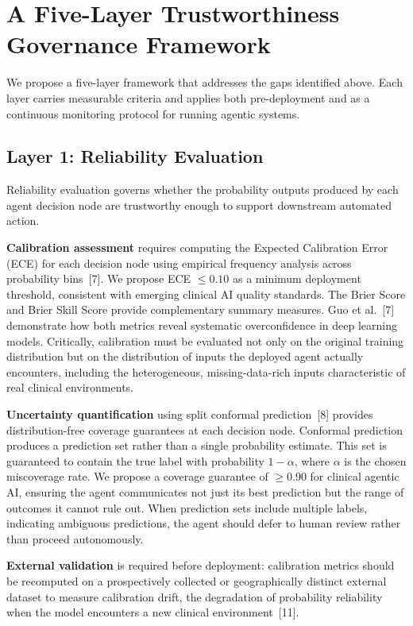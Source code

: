 \documentclass[11pt]{article}
\begin{document}
\section{A Five-Layer Trustworthiness Governance
Framework}\label{a-five-layer-trustworthiness-governance-framework}

We propose a five-layer framework that addresses the gaps identified
above. Each layer carries measurable criteria and applies both
pre-deployment and as a continuous monitoring protocol for running
agentic systems.

\subsection{Layer 1: Reliability Evaluation}\label{layer-1-reliability-evaluation}

Reliability evaluation governs whether the probability outputs produced
by each agent decision node are trustworthy enough to support downstream
automated action.

\textbf{Calibration assessment} requires computing the Expected
Calibration Error (ECE) for each decision node using empirical frequency
analysis across probability bins~{[}7{]}. We propose ECE $\leq 0.10$ as a
minimum deployment threshold, consistent with emerging clinical AI
quality standards. The Brier Score and Brier Skill Score provide
complementary summary measures. Guo et al.~{[}7{]} demonstrate how both
metrics reveal systematic overconfidence in deep learning models.
Critically, calibration must be evaluated not only on the original
training distribution but on the distribution of inputs the deployed
agent actually encounters, including the heterogeneous,
missing-data-rich inputs characteristic of real clinical environments.

\textbf{Uncertainty quantification} using split conformal
prediction~{[}8{]} provides distribution-free coverage guarantees at each
decision node. Conformal prediction produces a prediction set rather
than a single probability estimate. This set is guaranteed to contain
the true label with probability $1-\alpha$, where $\alpha$ is the chosen
miscoverage rate. We propose a coverage guarantee of $\geq 0.90$ for
clinical agentic AI, ensuring the agent communicates not just its best
prediction but the range of outcomes it cannot rule out. When prediction
sets include multiple labels, indicating ambiguous predictions, the
agent should defer to human review rather than proceed autonomously.

\textbf{External validation} is required before deployment: calibration
metrics should be recomputed on a prospectively collected or
geographically distinct external dataset to measure calibration drift,
the degradation of probability reliability when the model encounters a
new clinical environment~{[}11{]}.
\end{document}
